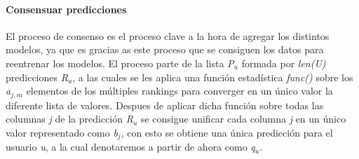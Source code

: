 \paragraph{Consensuar predicciones} El proceso de consenso es el proceso clave a la hora de agregar los distintos modelos, ya que es gracias as este proceso que se consiguen los datos para reentrenar los modelos. El proceso parte de la lista \textit{P$_{u}$} formada por \textit{len(U)} predicciones \textit{R$_{u}$}, a las cuales se les aplica una función estadística \textit{func()} sobre los \textit{a$_{j, m}$} elementos de los múltiples rankings para converger en un único valor la diferente lista de valores. Despues de aplicar dicha función sobre todas las columnas \textit{j} de la predicción \textit{R$_{u}$} se consigue unificar cada columna \textit{j} en un único valor representado como \textit{b$_{j}$}, con esto se obtiene una única predicción para el usuario \textit{u}, a la cual denotaremos a partir de ahora como \textit{q$_{u}$}.

